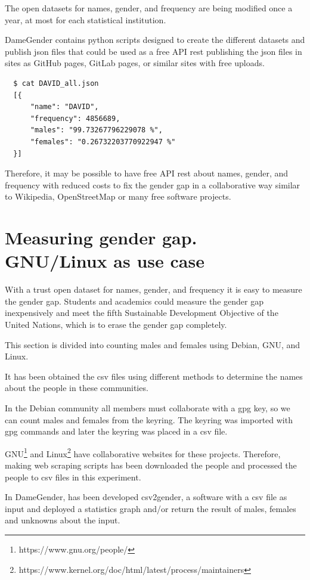 \documentclass[a4paper]{article}
\begin{document}
The open datasets for names, gender, and frequency are being modified once a year, at most for each statistical institution.

DameGender contains python scripts designed to create the
different datasets and publish json files that could be used as a free
API rest publishing the json files in sites as GitHub pages, GitLab
pages, or similar sites with free uploads.

\begin{verbatim}
  $ cat DAVID_all.json
  [{
      "name": "DAVID",
      "frequency": 4856689,
      "males": "99.73267796229078 %",
      "females": "0.26732203770922947 %"
  }]
\end{verbatim}

Therefore, it may be possible to have free API rest about names,
gender, and frequency with reduced costs to fix the gender gap
in a collaborative way similar to Wikipedia, OpenStreetMap or
many free software projects.

\section{Measuring gender gap. GNU/Linux as use case}
\label{sec:measuring}

With a trust open dataset for names, gender, and frequency it is
easy to measure the gender gap. Students and academics could
measure the gender gap inexpensively and meet the fifth
Sustainable Development Objective of the United Nations,
which is to erase the gender gap completely. 

This section is divided into counting males and females using
Debian, GNU, and Linux.

It has been obtained the csv files using different methods
to determine the names about the people in these communities.

In the Debian community all members must collaborate with
a gpg key, so we can count males and females from the keyring.
The keyring was imported with gpg commands and later 
the keyring was placed in a csv file.

GNU\footnote{https://www.gnu.org/people/} and
Linux\footnote{https://www.kernel.org/doc/html/latest/process/maintainers}
have collaborative websites for these projects. Therefore, making web
scraping scripts has been downloaded the people and processed
the people to csv files in this experiment.

In DameGender, has been developed csv2gender, a software with a csv
file as input and deployed a statistics graph and/or return the result
of males, females and unknowns about the input.
\end{document}
